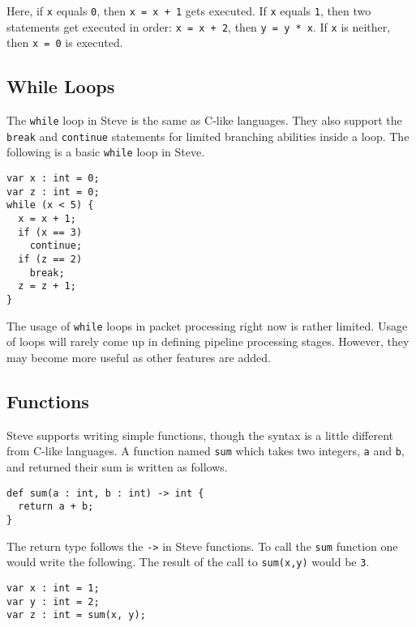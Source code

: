 Here, if \texttt{x} equals \texttt{0}, then \texttt{x = x + 1} gets executed. If
\texttt{x} equals \texttt{1}, then two statements get executed in order:
\texttt{x = x + 2}, then \texttt{y = y * x}. If \texttt{x} is neither, then
\texttt{x = 0} is executed.

\subsection{While Loops} \label{tut:while}

The \texttt{while} loop in Steve is the same as C-like languages. 
They also support the \texttt{break} and \texttt{continue} statements for limited
branching abilities inside a loop. The following is a basic \texttt{while} loop in Steve.

\begin{codepage}
\begin{lstlisting}
var x : int = 0;
var z : int = 0;
while (x < 5) {
  x = x + 1;
  if (x == 3)
    continue;
  if (z == 2)
    break;
  z = z + 1;
}
\end{lstlisting}
\end{codepage}

The usage of \texttt{while} loops in packet processing right now is rather limited. Usage
of loops will rarely come up in defining pipeline processing stages. However,
they may become more useful as other features are added.

\subsection{Functions} \label{tut:function}

Steve supports writing simple functions, though the syntax is a little different
from C-like languages.
A function named \texttt{sum} which takes two
integers, \texttt{a} and \texttt{b}, and returned their sum is written as follows.

\begin{codepage}
\begin{lstlisting}
def sum(a : int, b : int) -> int {
  return a + b;
}
\end{lstlisting}
\end{codepage}

The return type follows the \texttt{->} in Steve functions. To call
the \texttt{sum} function one would write the following. The result of the call to
\texttt{sum(x,y)} would be \texttt{3}.

\begin{codepage}
\begin{lstlisting}
var x : int = 1;
var y : int = 2;
var z : int = sum(x, y);
\end{lstlisting}
\end{codepage}

